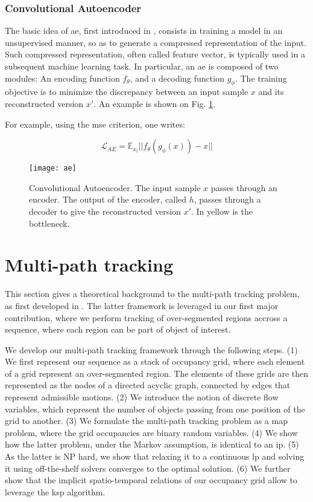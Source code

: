 \subsubsection{Convolutional Autoencoder}
The basic idea of \gls{ae}, first introduced in \cite{vincent10}, consists in training a model in an unsupervised manner, so as to generate a compressed representation of the input.
Such compressed representation, often called feature vector, is typically used in a subsequent machine learning task.
In particular, an \gls{ae} is composed of two modules: An encoding function $f_{\theta}$, and a decoding function $g_{\phi}$.
The training objective is to minimize the discrepancy between an input sample $x$ and its reconstructed version $x'$.
An example is shown on Fig. \ref{fig:ae}.

For example, using the \gls{mse} criterion, one writes:

\begin{equation}
\mathcal{L}_{AE} = \mathbb{E}_{x_{i}}||f_{\theta}(g_{\phi}(x)) - x ||
\end{equation}


\begin{figure}[!htpb]
  \centering
  \texttt{[image: ae]}
  \caption{Convolutional Autoencoder.
    The input sample $x$ passes through an encoder.
    The output of the encoder, called $h$, passes through a decoder to give the reconstructed version $x'$.
    In yellow is the bottleneck.}
  \label{fig:ae}
\end{figure}

\section{Multi-path tracking}
This section gives a theoretical background to the multi-path tracking problem, as first developed in \cite{berclaz11}.
The latter framework is leveraged in our first major contribution, where we perform tracking of over-segmented regions accross a sequence, where each region can be part of object of interest.

We develop our multi-path tracking framework through the following steps.
(1) We first represent our sequence as a stack of occupancy grid, where each element of a grid represent an over-segmented region.
The elements of these grids are then represented as the nodes of a directed acyclic graph, connected by edges that represent admissible motions.
(2) We introduce the notion of discrete flow variables, which represent the number of objects passing from one position of the grid to another.
(3) We formulate the multi-path tracking problem as a \gls{map} problem, where the grid occupancies are binary random variables.
(4) We show how the latter problem, under the Markov assumption, is identical to an \gls{ip}.
(5) As the latter is NP hard, we show that relaxing it to a continuous \gls{lp} and solving it using off-the-shelf solvers converges to the optimal solution.
(6) We further show that the implicit spatio-temporal relations of our occupancy grid allow to leverage the \gls{ksp} algorithm.

